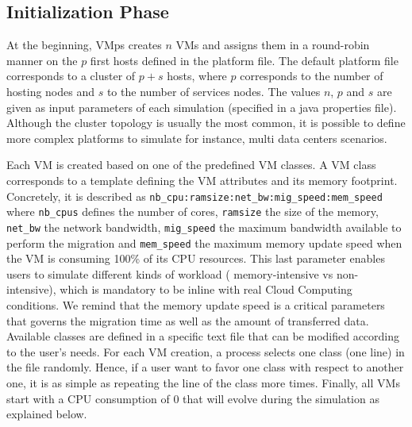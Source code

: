 \documentclass[conference]{IEEEtran}
\newcommand{\vmps}{VMps\xspace}
\begin{document}
\subsection{Initialization Phase}
At the beginning, \vmps creates $n$ VMs and assigns them in a
round-robin manner on the $p$ first hosts defined in the platform file.
The default platform file corresponds to a cluster of $p+s$ hosts,
where $p$ corresponds to the number of hosting nodes and $s$ to the
number of services nodes. The values $n$, $p$ and $s$ are given as input
parameters of each simulation (specified in a java properties file).
 Although the cluster topology is usually the
most common, it is possible to define more complex platforms to simulate for
instance, multi data centers scenarios.

Each VM is created based on one of the predefined VM classes. A VM
class corresponds to a template defining the VM attributes and its
memory footprint. Concretely, it is described as
\texttt{nb\_cpu:ramsize:net\_bw:mig\_speed:mem\_speed} where
\texttt{nb\_cpus} defines the number of cores, \texttt{ramsize} the
size of the memory, \texttt{net\_bw} the network bandwidth,
\texttt{mig\_speed} the maximum bandwidth available to perform the
migration and \texttt{mem\_speed} the maximum memory update speed when
the VM is consuming 100\% of its CPU resources. This last parameter
enables users to simulate different kinds of workload (\ie
memory-intensive vs non-intensive), which is mandatory to be inline
with real Cloud Computing conditions. We remind that the memory update
speed is a critical parameters that governs the migration time as well
as the amount of transferred data. Available classes are defined in a
specific text file that can be modified according to the user's needs.
For each VM creation, a process selects one class (\ie one line) in
the file randomly. Hence, if a user want to favor one class with
respect to another one, it is as simple as repeating the line of the
class more times. Finally, all VMs start with a CPU consumption of 0
that will evolve during the simulation as explained below.
\end{document}

